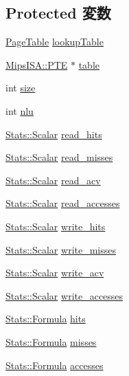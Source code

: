 \subsection*{Protected 変数}
\begin{DoxyCompactItemize}
\item 
\hyperlink{classPageTable}{PageTable} \hyperlink{classMipsISA_1_1TLB_a4d5c35d797dc31aad758dee75916238f}{lookupTable}
\item 
\hyperlink{structMipsISA_1_1PTE}{MipsISA::PTE} $\ast$ \hyperlink{classMipsISA_1_1TLB_ad68aa3f5866917e204c3a606df3b076a}{table}
\item 
int \hyperlink{classMipsISA_1_1TLB_a439227feff9d7f55384e8780cfc2eb82}{size}
\item 
int \hyperlink{classMipsISA_1_1TLB_a4a3ee7780f871ead437ece349ddc2147}{nlu}
\item 
\hyperlink{classStats_1_1Scalar}{Stats::Scalar} \hyperlink{classMipsISA_1_1TLB_a766fdbd2ab7d588c3c9fa426ce395ed6}{read\_\-hits}
\item 
\hyperlink{classStats_1_1Scalar}{Stats::Scalar} \hyperlink{classMipsISA_1_1TLB_a6fb393c9489d735739552c2a351f07f4}{read\_\-misses}
\item 
\hyperlink{classStats_1_1Scalar}{Stats::Scalar} \hyperlink{classMipsISA_1_1TLB_af50813bd757bd59aa3618aa99377760a}{read\_\-acv}
\item 
\hyperlink{classStats_1_1Scalar}{Stats::Scalar} \hyperlink{classMipsISA_1_1TLB_a2c9dc5a6baf7fbd1ae7fc00b0a57fe56}{read\_\-accesses}
\item 
\hyperlink{classStats_1_1Scalar}{Stats::Scalar} \hyperlink{classMipsISA_1_1TLB_ab3172bfd014e75dcad1b0a2a91de59dd}{write\_\-hits}
\item 
\hyperlink{classStats_1_1Scalar}{Stats::Scalar} \hyperlink{classMipsISA_1_1TLB_af8519a07f8f1f76c8fff9c9a1aaa4638}{write\_\-misses}
\item 
\hyperlink{classStats_1_1Scalar}{Stats::Scalar} \hyperlink{classMipsISA_1_1TLB_a764f5ef97bfcb1ba3ad05704de5a3a32}{write\_\-acv}
\item 
\hyperlink{classStats_1_1Scalar}{Stats::Scalar} \hyperlink{classMipsISA_1_1TLB_af3301e9dd0bb91de161b7bafefade7f3}{write\_\-accesses}
\item 
\hyperlink{classStats_1_1Formula}{Stats::Formula} \hyperlink{classMipsISA_1_1TLB_a224eed77bfb7a27359c9c3c1acbdbfaa}{hits}
\item 
\hyperlink{classStats_1_1Formula}{Stats::Formula} \hyperlink{classMipsISA_1_1TLB_a4b8b96257f1e97cd5730673f38f9571c}{misses}
\item 
\hyperlink{classStats_1_1Formula}{Stats::Formula} \hyperlink{classMipsISA_1_1TLB_a1929e1032289676f78e07e4c6bc55369}{accesses}
\end{DoxyCompactItemize}
